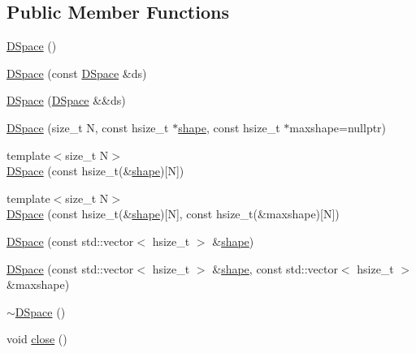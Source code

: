 \subsection*{Public Member Functions}
\begin{DoxyCompactItemize}
\item 
\hyperlink{class_h5_t_l_1_1_d_space_abe4839703fc08c5851b8388ee43177ef}{D\-Space} ()
\item 
\hyperlink{class_h5_t_l_1_1_d_space_a0ba05245349237b1e42813cf4397fa32}{D\-Space} (const \hyperlink{class_h5_t_l_1_1_d_space}{D\-Space} \&ds)
\item 
\hyperlink{class_h5_t_l_1_1_d_space_af10333ae1d222213a34db2a338ae158c}{D\-Space} (\hyperlink{class_h5_t_l_1_1_d_space}{D\-Space} \&\&ds)
\item 
\hyperlink{class_h5_t_l_1_1_d_space_a0bacd841219760f82023a5c6d34d71c8}{D\-Space} (size\-\_\-t N, const hsize\-\_\-t $\ast$\hyperlink{namespace_h5_t_l_a18d3869e336e2b6a64ec318cf9890c90}{shape}, const hsize\-\_\-t $\ast$maxshape=nullptr)
\item 
{\footnotesize template$<$size\-\_\-t N$>$ }\\\hyperlink{class_h5_t_l_1_1_d_space_a361184a3052fd5fe5bd71454b244007d}{D\-Space} (const hsize\-\_\-t(\&\hyperlink{namespace_h5_t_l_a18d3869e336e2b6a64ec318cf9890c90}{shape})\mbox{[}N\mbox{]})
\item 
{\footnotesize template$<$size\-\_\-t N$>$ }\\\hyperlink{class_h5_t_l_1_1_d_space_a376a9922dbf0eb7234bb33d5e14825a9}{D\-Space} (const hsize\-\_\-t(\&\hyperlink{namespace_h5_t_l_a18d3869e336e2b6a64ec318cf9890c90}{shape})\mbox{[}N\mbox{]}, const hsize\-\_\-t(\&maxshape)\mbox{[}N\mbox{]})
\item 
\hyperlink{class_h5_t_l_1_1_d_space_a911e7f9f9398e7324c508f55fe63baaa}{D\-Space} (const std\-::vector$<$ hsize\-\_\-t $>$ \&\hyperlink{namespace_h5_t_l_a18d3869e336e2b6a64ec318cf9890c90}{shape})
\item 
\hyperlink{class_h5_t_l_1_1_d_space_aed1106ff0fb79eda9c2666b62eebc4d8}{D\-Space} (const std\-::vector$<$ hsize\-\_\-t $>$ \&\hyperlink{namespace_h5_t_l_a18d3869e336e2b6a64ec318cf9890c90}{shape}, const std\-::vector$<$ hsize\-\_\-t $>$ \&maxshape)
\item 
\hyperlink{class_h5_t_l_1_1_d_space_a7abcd0097c46b8f3252b6610bca3ebd1}{$\sim$\-D\-Space} ()
\item 
void \hyperlink{class_h5_t_l_1_1_d_space_a527298cfe321414033f52329a49e6b7a}{close} ()
\item 

\end{DoxyCompactItemize}
